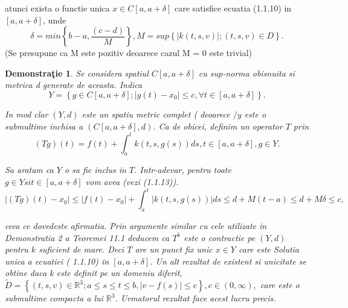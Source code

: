 \documentclass[a4paper,12pt,oneside]{report}
\newtheorem{demonstration}{Demonstra\c tie}
\begin{document}
	atunci exista o functie unica \(x\in C \left [ a, a + \delta  \right ]\) care satisfice ecuatia (1.1.10) in  \(\left [ a, a + \delta  \right ]\), unde 
	\begin{displaymath}
		\delta  = min \left \{ b-a, \frac{\left ( c-d \right )}{M} \right \}, M = sup \left \{ \left | k\left ( t,s,v \right ) \right |;\left ( t,s,v \right ) \in D \right \}.
	\end{displaymath}
	(Se presupune ca M este pozitiv deoarece cazul M = 0 este trivial)
					
					
	\begin{demonstration}
		Se considera spatiul \(C \left [ a, a + \delta  \right ]\) cu sup-norma obisnuita si metrica d generate de aceasta.  Indica 
		\begin{displaymath}
			Y = \left \{ g\in C \left [ a,a+\delta  \right ] ; \left | g\left ( t \right ) - x_{0}\right | \leq c, \forall t \in \left [ a, a+\delta  \right ]\right \}. 
		\end{displaymath}
										
		In mod clar \(\left ( Y,d \right )\) este un spatiu metric complet ( deoarece \(/y\) este o submultime inchisa a \(\left ( C \left [ a, a + \delta  \right ] , d \right )\). Ca de obicei, definim un operator \(T\) prin
		\begin{displaymath}
			\left ( Tg \right )\left ( t \right ) = f\left ( t \right ) + \int_{a}^{t}k\left ( t,s,g\left ( s \right ) \right )ds, t\in \left [ a, a + \delta  \right ], g\in Y. 
		\end{displaymath}
										
		Sa aratam ca \(Y\) o sa fie inclus in \(T\). Intr-adevar, pentru toate \(g\in Y si t\in \left [ a, a+ \delta  \right ]\) vom avea (vezi (1.1.13)). 
		\begin{displaymath}
			\left | \left ( Tg \right )\left ( t \right ) - x_{0}\right | \leq \left | f\left ( t \right )-x_{0} \right | + \int_{a}^{t}\left | k\left ( t,s,g\left ( s \right ) \right ) \right |ds \leq d + M\left ( t-a \right ) \leq  d+ M\delta  \leq  c,
		\end{displaymath}
										 
		ceea ce dovedeste afirmatia. Prin argumente similar cu cele utilizate in Demonstratia 2 a Teoremei 11.1 deducem ca \(T^{k}\) este o contractie pe \(\left ( Y,d \right )\) pentru \(k\) suficient de mare. Deci \(T\) are un punct fix unic \(x \in Y\) care este Solutia unica a ecuatiei ( 1.1.10) in \(\left [ a, a + \delta  \right ]\). 
		Un alt rezultat de existent si unicitate se obtine daca k este definit pe un domeniu diferit, \(\tilde{D} = \left \{ \left ( t,s,v \right ) \in \mathbb{R}^{3}; a\leq s\leq t\leq b, \left | v - f\left ( s \right ) \right | \leq c \right \}, c\in \left ( 0, \infty  \right ), \)
		care este o submultime compacta a lui \(\mathbb{R}^{3}\). Urmatorul rezultat face acest lucru precis. 
											
	\end{demonstration}
					
\end{document}
